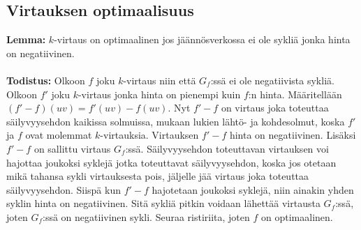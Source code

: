 \documentclass[a4paper, 11pt]{article}
\begin{document}
\subsection*{Virtauksen optimaalisuus}
\textbf{Lemma:} $k$-virtaus on optimaalinen jos jäännösverkossa ei ole sykliä jonka
hinta on negatiivinen.\\\\
\noindent
\textbf{Todistus:} Olkoon $f$ joku $k$-virtaus niin että $G_f$:ssä ei ole negatiivista
sykliä. Olkoon $f'$ joku $k$-virtaus jonka hinta on pienempi kuin $f$:n hinta. Määritellään
$(f' - f)(uv) = f'(uv) - f(uv)$. Nyt $f' - f$ on virtaus joka toteuttaa säilyvyysehdon kaikissa 
solmuissa, mukaan lukien lähtö- ja kohdesolmut, koska $f'$ ja $f$ ovat molemmat $k$-virtauksia.
Virtauksen $f' - f$ hinta on negatiivinen. Lisäksi $f' - f$ on sallittu
virtaus $G_f$:ssä. Säilyvyysehdon toteuttavan virtauksen voi hajottaa joukoksi syklejä
jotka toteuttavat säilyvyysehdon, koska jos otetaan mikä tahansa
sykli virtauksesta pois, jäljelle jää virtaus joka toteuttaa säilyvyysehdon.
Siispä kun $f' - f$ hajotetaan joukoksi syklejä, niin ainakin yhden syklin hinta on negatiivinen.
Sitä sykliä pitkin voidaan lähettää virtausta $G_f$:ssä, joten $G_f$:ssä on negatiivinen sykli.
Seuraa ristiriita, joten $f$ on optimaalinen.
\noindent
\end{document}
